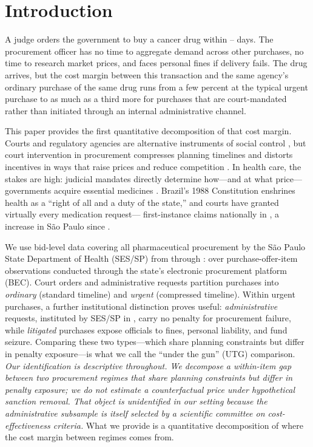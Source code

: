 \section{Introduction}
\label{sec:introduction}

A judge orders the government to buy a cancer drug within \BPurgentPlanLow--\BPurgentPlanHigh{} days. The procurement officer has no time to aggregate demand across other purchases, no time to research market prices, and faces personal fines if delivery fails. The drug arrives, but the cost margin between this transaction and the same agency's ordinary purchase of the same drug runs from a few percent at the typical urgent purchase to as much as a third more for purchases that are court-mandated rather than initiated through an internal administrative channel.

This paper provides the first quantitative decomposition of that cost margin. Courts and regulatory agencies are alternative instruments of social control \citep{glaeser2003rise}, but court intervention in procurement compresses planning timelines and distorts incentives in ways that raise prices and reduce competition \citep{coviello2018court}. In health care, the stakes are high: judicial mandates directly determine how---and at what price---governments acquire essential medicines \citep{wang2015right, ferraz2009right}. Brazil's 1988 Constitution enshrines health as a ``right of all and a duty of the state,'' and courts have granted virtually every medication request---\BPlitClaimsBR{} first-instance claims nationally in \BPcnjClaimsYear, a \BPspGrowthSince{} increase in S\~ao Paulo since \BPspGrowthBaseYear{} \citep{cnj2019judicializacao}.

We use bid-level data covering all pharmaceutical procurement by the S\~ao Paulo State Department of Health (SES/SP) from \BPsampleStartYear{} through \BPsampleEndYear: over \BPnPOIfull{} purchase-offer-item observations conducted through the state's electronic procurement platform (BEC). Court orders and administrative requests partition purchases into \textit{ordinary} (standard timeline) and \textit{urgent} (compressed timeline). Within urgent purchases, a further institutional distinction proves useful: \textit{administrative} requests, instituted by SES/SP in \BPsampleStartYear{}, carry no penalty for procurement failure, while \textit{litigated} purchases expose officials to fines, personal liability, and fund seizure. Comparing these two types---which share planning constraints but differ in penalty exposure---is what we call the ``under the gun'' (UTG) comparison. \emph{Our identification is descriptive throughout. We decompose a within-item gap between two procurement regimes that share planning constraints but differ in penalty exposure; we do not estimate a counterfactual price under hypothetical sanction removal. That object is unidentified in our setting because the administrative subsample is itself selected by a scientific committee on cost-effectiveness criteria.} What we provide is a quantitative decomposition of where the cost margin between regimes comes from.

